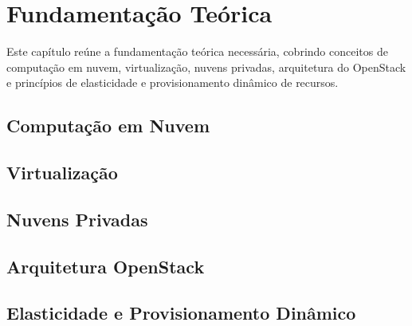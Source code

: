 \chapter{Fundamentação Teórica}

Este capítulo reúne a fundamentação teórica necessária, cobrindo conceitos de computação em nuvem, virtualização, nuvens privadas, arquitetura do OpenStack e princípios de elasticidade e provisionamento dinâmico de recursos.

\section{Computação em Nuvem}

\section{Virtualização}

\section{Nuvens Privadas}

\section{Arquitetura OpenStack}

\section{Elasticidade e Provisionamento Dinâmico}
